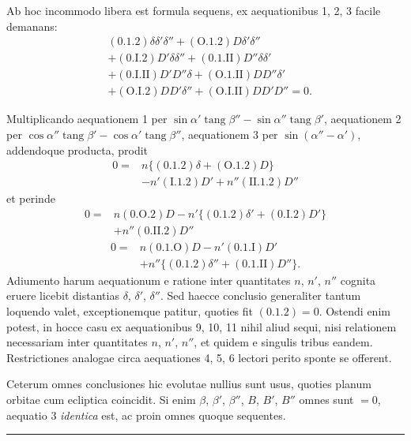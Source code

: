 \par
Ab hoc incommodo libera est formula sequens, ex aequationibus 1, 2, 3 facile demanans:
\[
\begin{aligned}
&(0.1.2)\delta\delta'\delta''+(\mathrm{O}.1.2)D\delta'\delta''\\
&+(0.\mathrm{I}.2)D'\delta\delta''+(0.1.\mathrm{II})D''\delta\delta'\\
&+(0.\mathrm{I}.\mathrm{II})D'D''\delta+(\mathrm{O}.1.\mathrm{II})DD''\delta'\\
&+(\mathrm{O}.\mathrm{I}.2)DD'\delta''+(\mathrm{O}.\mathrm{I}.\mathrm{II})DD'D''=0.
\end{aligned}\tag*{8)}
\]
\par
Multiplicando aequationem 1 per $\sin\alpha'\operatorname{tang}\beta''-\sin\alpha''\operatorname{tang}\beta'$, aequationem 2 per $\cos\alpha''\operatorname{tang}\beta'-\cos\alpha'\operatorname{tang}\beta''$, aequationem 3 per $\sin(\alpha''-\alpha')$, addendoque producta, prodit
\[
\begin{aligned}
0={}&n\{(0.1.2)\delta+(\mathrm{O}.1.2)D\}\\
&-n'(\mathrm{I}.1.2)D'+n''(\mathrm{II}.1.2)D''
\end{aligned}\tag*{9)}
\]
et perinde
\[
\begin{aligned}
0={}&n(0.\mathrm{O}.2)D-n'\{(0.1.2)\delta'+(0.\mathrm{I}.2)D'\}\\
&+n''(0.\mathrm{II}.2)D''
\end{aligned}\tag*{10)}
\]
\[
\begin{aligned}
0={}&n(0.1.\mathrm{O})D-n'(0.1.\mathrm{I})D'\\
&+n''\{(0.1.2)\delta''+(0.1.\mathrm{II})D''\}.
\end{aligned}\tag*{11)}
\]
Adiumento harum aequationum e ratione inter quantitates $n$, $n'$, $n''$ cognita eruere licebit distantias $\delta$, $\delta'$, $\delta''$. Sed haecce conclusio generaliter tantum loquendo valet, exceptionemque patitur, quoties fit $(0.1.2)=0$. Ostendi enim potest, in hocce casu ex aequationibus 9, 10, 11 nihil aliud sequi, nisi relationem necessariam inter quantitates $n$, $n'$, $n''$, et quidem e singulis tribus eandem. Restrictiones analogae circa aequationes 4, 5, 6 lectori perito sponte se offerent.
\par
Ceterum omnes conclusiones hic evolutae nullius sunt usus, quoties planum orbitae cum ecliptica coincidit. Si enim $\beta$, $\beta'$, $\beta''$, $B$, $B'$, $B''$ omnes sunt $=0$, aequatio 3 \emph{identica} est, ac proin omnes quoque sequentes.
\par\bigskip\begin{center}\rule{.23\linewidth}{.35pt}\end{center}
